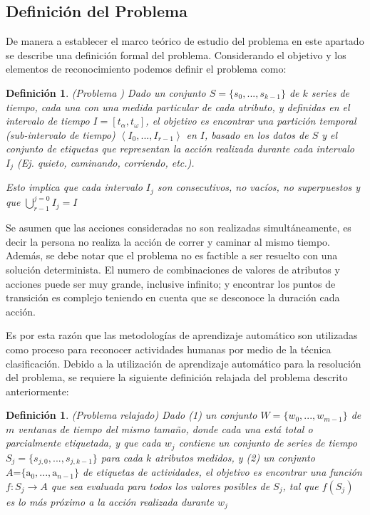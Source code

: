 \subsection{Definición del Problema}

\label{sec261:definicion-har}De manera a establecer el marco teórico
de estudio del problema  en este apartado se describe una
definición formal del problema. Considerando el objetivo y los elementos
de reconocimiento podemos definir el problema como\cite{LaraLabrador2013}:

\label{def2:harp}\newtheorem{defs}{Definición}

\begin{defs}(Problema ) Dado un conjunto $S=\{s_{0},...,s_{k-1}\}$
de $k$ series de tiempo, cada una con una medida particular de cada
atributo, y definidas en el intervalo de tiempo $I=\left[t_{\alpha},t_{\omega}\right]$,
el objetivo es encontrar una partición temporal (\emph{sub}-intervalo
de tiempo) $\left\langle I_{0},...,I_{r-1}\right\rangle $ en $I$,
basado en los datos de $S$ y el conjunto de etiquetas que representan
la acción realizada durante cada intervalo $I_{j}$ (Ej. quieto, caminando,
corriendo, etc.). 

Esto implica que cada intervalo $I_{j}$ son consecutivos, no vacíos,
no superpuestos y que ${\displaystyle \bigcup_{r-1}^{j=0}{I_{j}=I}}$
\end{defs}

Se asumen que las acciones consideradas no son realizadas simultáneamente,
es decir la persona no realiza la acción de correr y caminar al mismo
tiempo. Además, se debe notar que el problema  no es factible
a ser resuelto con una solución determinista. El numero de combinaciones
de valores de atributos y acciones puede ser muy grande, inclusive
infinito; y encontrar los puntos de transición es complejo teniendo
en cuenta que se desconoce la duración cada acción. 

Es por esta razón que las metodologías de aprendizaje automático son
utilizadas como proceso para reconocer actividades humanas por medio
de la técnica clasificación. Debido a la utilización de aprendizaje
automático para la resolución del problema, se requiere la siguiente
definición relajada del problema  descrito anteriormente: 

\label{def2:harp-rel}\newtheorem{defs}{Definición}

\begin{defs}(Problema  relajado) Dado (1) un conjunto
$W=\{w_{0},...,w_{m-1}\}$ de $m$ ventanas de tiempo del mismo tamaño,
donde cada una está total o parcialmente etiquetada, y que cada $w_{j}$
contiene un conjunto de series de tiempo $S_{j}=\{s_{j,0},...,s_{j,k-1}\}$
para cada $k$ atributos medidos, y (2) un conjunto $A\text{=}\{\mathrm{a}_{0},...,\mathrm{a}_{n-1}\}$
de etiquetas de actividades, el objetivo es encontrar una función
$f\colon S_{j}\rightarrow A$ que sea evaluada para todos los valores
posibles de $S_{j}$, tal que $f(S_{j})$ es lo más próximo a la acción
realizada durante $w_{j}$ \end{defs}

